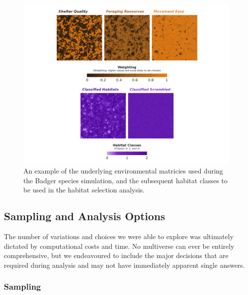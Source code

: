 \documentclass[10pt,a4paper]{article}
\begin{document}
\begin{figure}
\includegraphics[width=1\linewidth]{../figures/landscapeExample} \caption{An example of the underlying environmental matricies used during the Badger species simulation, and the subsequent habitat classes to be used in the habitat selection analysis.}\label{fig:landscapeExample}
\end{figure}

\subsection{Sampling and Analysis Options}\label{sampling-and-analysis-options}

The number of variations and choices we were able to explore was ultimately dictated by computational costs and time.
No multiverse can ever be entirely comprehensive, but we endeavoured to include the major decisions that are required during analysis and may not have immediately apparent single answers.

\subsubsection{Sampling}\label{sampling}
\end{document}
